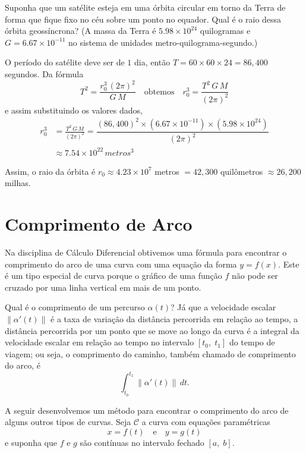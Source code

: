 \begin{exc}
Suponha que um satélite esteja em uma órbita circular em torno da Terra de forma que fique fixo no céu sobre um ponto no equador. Qual é o raio dessa órbita geossíncrona? (A massa da Terra é $5.98 \times 10^{24}$ quilogramas e $G=6.67 \times 10^{-11}$ no sistema de unidades metro-quilograma-segundo.)
\end{exc}

\solo
O período do satélite deve ser de $1$ dia, então $T = 60 \times 60 \times 24 = 86,400$ segundos. Da fórmula
\begin{equation*}
T^{2} = \dfrac{r^{3}_{0}\, (2\pi)^{2}}{G\,M}\quad \text{obtemos}\quad r^{3}_{0} = \dfrac{T^{2}\,G\, M}{(2\pi)^{2}}
\end{equation*}
e assim substituindo os valores dados,
\begin{align*}
r_{0}^{3} &= \frac{T^{2}\, G\, M}{(2\pi)^{2}}= \dfrac{(86,400)^{2}\times (6.67\times 10^{-11})\times (5.98\times 10^{24})}{(2\pi)^{2}}\\[2ex]
      & \approx 7.54 \times 10^{22}\, metros^{3}
\end{align*}

Assim, o raio da órbita é $r_{0} \approx 4.23 \times 10^{7}$ metros $= 42,300$ quilômetros $\approx 26,200$ milhas.


%
\section{Comprimento de Arco}
%
Na disciplina de Cálculo Diferencial obtivemos uma fórmula para encontrar o comprimento do arco de uma curva com uma equação da forma \(y=f(x)\). Este
é um tipo especial de curva porque o gráfico de uma função \(f\) não pode ser cruzado por uma linha vertical em mais de um ponto.

Qual é o comprimento de um percurso $\alpha(t)$? Já que a velocidade escalar $\|\alpha'(t)\|$ é a taxa de variação da distância percorrida em relação ao
tempo, a distância percorrida por um ponto que se move ao longo da curva é a integral da velocidade escalar em relação ao tempo no intervalo
$[t_{0},\; t_{1}]$ do tempo de viagem; ou seja, o comprimento do caminho, também chamado de comprimento do arco, é
\begin{equation*}
\int_{t_{0}}^{t_{1}}\|\alpha'(t)\|\, dt.
\end{equation*}

A seguir desenvolvemos um método para encontrar o comprimento do arco de alguns outros tipos de curvas. Seja \(\mathcal{C}\) a curva com equações
paramétricas
\begin{equation*}
x = f(t) \quad \text{e} \quad   y = g(t)
\end{equation*}
e suponha que \(f\) e \(g\) são contínuas no intervalo fechado \([a,\; b]\).

